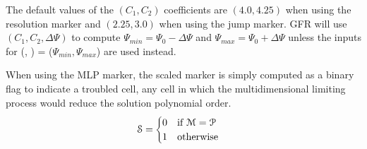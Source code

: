 
%

The default values of the $(C_1,C_2)$ coefficients are
$(4.0,4.25)$ when using the resolution marker and
$(2.25,3.0)$ when using the jump marker.
%
GFR will use $(C_1,C_2,\Delta\Psi)$ to compute 
$\Psi_{min} = \Psi_0-\Delta\Psi$ and
$\Psi_{max} = \Psi_0+\Delta\Psi$
unless the inputs for
(,%
 )
=
($\Psi_{min},\Psi_{max}$) are used instead.


When using the MLP marker, the scaled marker is simply computed as
a binary flag to indicate a troubled cell, \thatis any cell in which
the multidimensional limiting process would reduce the solution
polynomial order.
\begin{align}
    {\cal S}
 =& \begin{cases}
       0 & \text{if ${\cal M} = {\cal P}$}
    \\ 1 & \text{otherwise}
    \end{cases}
\end{align}



